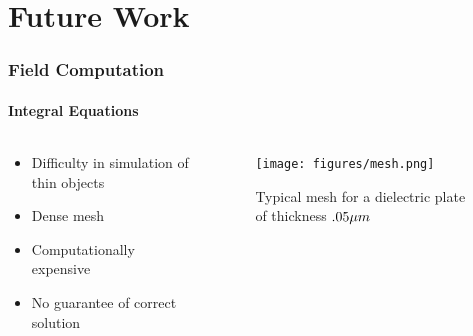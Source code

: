 \documentclass[mathserif,18pt,xcolor=table]{beamer}
\begin{document}
\section{Future Work}
\begin{frame}
  \frametitle{Field Computation}
  \framesubtitle{Integral Equations}
  \begin{columns} %
    \begin{column}[T]{.5\textwidth}
      \begin{itemize}
        \item Difficulty in simulation of thin objects
        \item Dense mesh
        \item Computationally expensive
        \item No guarantee of correct solution
      \end{itemize}
    \end{column}
    \begin{column}[T]{.5\textwidth}
      \begin{figure}[!t]
         \noindent
         \texttt{[image: figures/mesh.png]}
         \caption{Typical mesh for a dielectric plate of thickness $.05 \mu m$}
         \label{fig:mesh}
      \end{figure}
      \end{column}%
    \end{columns}
  \end{frame}
\end{document}
